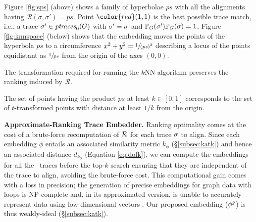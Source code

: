 %
\begin{example}
{Figure \ref{fig:sps} (above) shows a family of hyperbolae $ps$ with all the alignments having 
$\mathcal{R}(\sigma,\sigma')=ps$. Point $\color{red}(1,1)$ is the best possible trace match, i.e., a trace 
$\nonlogtrace\in\ptraces{G}{0}$ with $\nonlogtrace=\logtrace$ and $\mathbb{P}_G(\nonlogtrace)\mathbb{P}_G(\logtrace)=1$.
%		
Figure \ref{fig:knnspace} (below) shows that the embedding moves the points of the hyperbola $ps$ to a circumference $x^2+y^2=\sfrac{1}{(ps)^2}$ describing a locus of the points equidistant as $\sfrac{1}{ps}$ from the origin of the axes $(0,0)$.}
\end{example}
%
The transformation required for running the $k$NN algorithm preserves the ranking induced by $\mathcal{R}$.

\begin{lemma}
The set of points having the product $ps$ at least $k\in[0,1]$ corresponds to the set of $t$-transformed points with distance 
at least $1/k$ from the origin.
\end{lemma}
%
	
\noindent
\textbf{Approximate-Ranking Trace Embedder.}\label{subsec:ate}
Ranking optimality comes at the cost of a brute-force recomputation of $\goldenrank$ for each trace $\logtrace$ to align.
Since each embedding $\phi$ entails an associated similarity metric $k_\phi$ (\S\ref{subsec:katk}) and hence an associated
distance $d_{k_\phi}$ (Equation \ref{eq:dofk}), we can compute the embeddings for all the \unravelled\ traces
before the top-$k$ search ensuring that they are independent of the trace to align, avoiding the brute-force cost. 
This computational gain comes with a loss in precision; the generation of precise embeddings for graph data with loops is 
NP-complete \cite{GartnerFW03} and, in its approximated version, is unable to accurately represent data using low-dimensional 
vectors \cite{Seshadhri5631}. Our proposed embedding ($\gorgembed$) is thus weakly-ideal (\S\ref{subsec:katk}).

